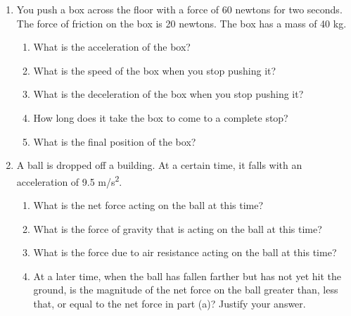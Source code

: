 \documentclass[letterpaper, 12pt]{article}
\begin{document}
\begin{enumerate}
\begin{enumerate}
\end{enumerate}

\pagebreak


\item You push a box across the floor with a force of 60 newtons for two seconds.  The force of friction on the box is 20 newtons.  The box has a mass of 40 kg.  
\begin{enumerate}
	\item What is the acceleration of the box?
	\vspace{0.4in}
	\item What is the speed of the box when you stop pushing it?
	\vspace{0.4in}
	\item What is the deceleration of the box when you stop pushing it?
	\vspace{0.4in}
	\item How long does it take the box to come to a complete stop?
	\vspace{0.4in}
	\item What is the final position of the box?
	\vspace{0.4in}
\end{enumerate}

\item A ball is dropped off a building.  At a certain time, it falls with an acceleration of 9.5 m/s\textsuperscript{2}. 
	\begin{enumerate}
		\item What is the net force acting on the ball at this time?
		\vspace{0.45in}		
		\item What is the force of gravity that is acting on the ball at this time?
		\vspace{0.45in}
		\item What is the force due to air resistance acting on the ball at this time?  
		\vspace{0.45in}
		\item At a later time, when the ball has fallen farther but has not yet hit the ground, is the magnitude of the net force on the ball greater than, less that, or equal to the net force in part (a)?  Justify your answer. 
		\end{enumerate}




\end{enumerate}


 
\end{document}
